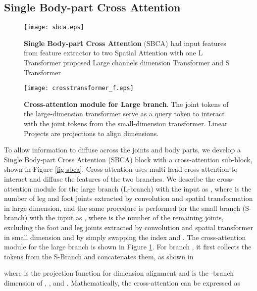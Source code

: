 \documentclass{bmvc2k}
\begin{document}
\subsection{Single Body-part Cross Attention}

\begin{figure}[tbp]
  \begin{minipage}[b]{0.48\columnwidth}
    \centering
    \texttt{[image: sbca.eps]}
    \label{fig-sbca}
    \caption{\textbf{Single Body-part Cross Attention} (SBCA) had input features from feature extractor to two Spatial Attention with one L Transformer proposed Large channels dimension Transformer and S Transformer }
  \end{minipage}
  \hspace{0.02\columnwidth} \begin{minipage}[b]{0.48\columnwidth}
    \centering
    \texttt{[image: crosstransformer\_f.eps]}
    \label{fig-cross}
    \caption{\textbf{Cross-attention module for Large branch}. The joint tokens of the large-dimension transformer serve as a query token to interact with the joint tokens from the small-dimension transformer. Linear Projects are projections to align dimensions.}
  \end{minipage}
\end{figure}

To allow information to diffuse across the joints and body parts, we develop a Single Body-part Cross Attention (SBCA) block with a cross-attention sub-block, shown in Figure \ref{fig-sbca}. Cross-attention uses multi-head cross-attention to interact and diffuse the features of the two branches. We describe the cross-attention module for the large branch (L-branch) with the input as , where  is the number of leg and foot joints extracted by  convolution and spatial transformation in large dimension, and the same procedure is performed for the small branch (S-branch) with the input as , where  is the number of the remaining joints, excluding the foot and leg joints extracted by  convolution and spatial transformer in small dimension and by simply swapping the index  and . The cross-attention module for the large branch is shown in Figure \ref{fig-cross}. For branch , it first collects the tokens from the S-Branch and concatenates them, as shown in

where  is the projection function for dimension alignment and  is the -branch dimension of , , and .
Mathematically, the cross-attention can be expressed as
\end{document}
